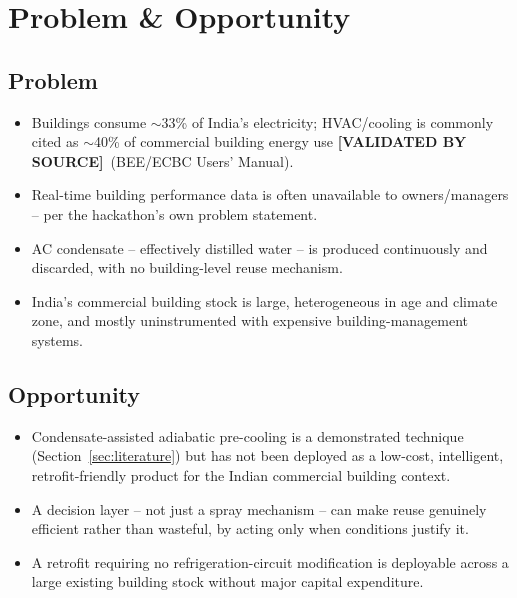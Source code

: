 \documentclass[11pt,a4paper]{article}
\newcommand{\validated}{\textcolor{climoragreen}{\textbf{[VALIDATED BY SOURCE]}}}
\begin{document}
\section{Problem \& Opportunity}

\subsection{Problem}
\begin{itemize}
    \item Buildings consume $\sim$33\% of India's electricity; HVAC/cooling is commonly cited as $\sim$40\% of commercial building energy use \validated\ (BEE/ECBC Users' Manual).
    \item Real-time building performance data is often unavailable to owners/managers -- per the hackathon's own problem statement.
    \item AC condensate -- effectively distilled water -- is produced continuously and discarded, with no building-level reuse mechanism.
    \item India's commercial building stock is large, heterogeneous in age and climate zone, and mostly uninstrumented with expensive building-management systems.
\end{itemize}

\subsection{Opportunity}
\begin{itemize}
    \item Condensate-assisted adiabatic pre-cooling is a demonstrated technique (Section~\ref{sec:literature}) but has not been deployed as a low-cost, intelligent, retrofit-friendly product for the Indian commercial building context.
    \item A decision layer -- not just a spray mechanism -- can make reuse genuinely efficient rather than wasteful, by acting only when conditions justify it.
    \item A retrofit requiring no refrigeration-circuit modification is deployable across a large existing building stock without major capital expenditure.
\end{itemize}
\end{document}
